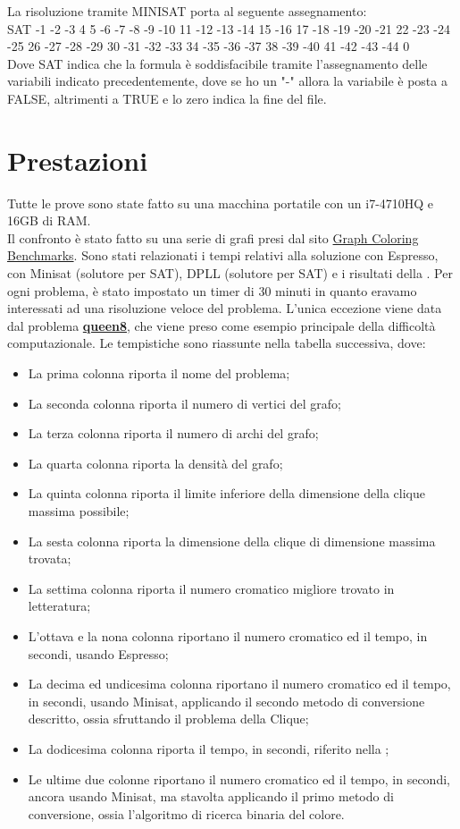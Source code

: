 \documentclass[a4paper,11pt]{article} %
\begin{document}
La risoluzione tramite MINISAT porta al seguente assegnamento:\\
SAT
-1 -2 -3 4 5 -6 -7 -8 -9 -10 11 -12 -13 -14 15 -16 17 -18 -19 -20 -21 22 -23 -24 -25 26 -27 -28 -29 30 -31 -32 -33 34 -35 -36 -37 38 -39 -40 41 -42 -43 -44 0\\
Dove SAT indica che la formula è soddisfacibile tramite l'assegnamento delle variabili indicato precedentemente, dove se ho un "-" allora la variabile è posta a FALSE, altrimenti a TRUE e lo zero indica la fine del file.

\pagebreak

\section{Prestazioni}
Tutte le prove sono state fatto su una macchina portatile con un i7-4710HQ e 16GB di RAM.\\
Il confronto è stato fatto su una serie di grafi presi dal sito \href{https://sites.google.com/site/graphcoloring/vertex-coloring}{Graph Coloring Benchmarks}\cite{site}. Sono stati relazionati i tempi relativi alla soluzione con Espresso, con Minisat \cite{minisat} (solutore per SAT), DPLL \cite{dpll}(solutore per SAT) e i risultati della \cite{tesi}.
Per ogni problema, è stato impostato un timer di 30 minuti in quanto eravamo interessati ad una risoluzione veloce del problema. L'unica eccezione viene data dal problema \href{https://it.wikipedia.org/wiki/Rompicapo_delle_otto_regine}{\textbf{queen8}}, che viene preso come esempio principale della difficoltà computazionale.
Le tempistiche sono riassunte nella tabella successiva, dove:
\begin{itemize}
	\item La prima colonna riporta il nome del problema;
	\item La seconda colonna riporta il numero di vertici del grafo;
	\item La terza colonna riporta il numero di archi del grafo;
	\item La quarta colonna riporta la densità del grafo;
	\item La quinta colonna riporta il limite inferiore della dimensione della clique massima possibile;
	\item La sesta colonna riporta la dimensione della clique di dimensione massima trovata;
	\item La settima colonna riporta il numero cromatico migliore trovato in letteratura;
	\item L'ottava e la nona colonna riportano il numero cromatico ed il tempo, in secondi, usando Espresso;
	\item La decima ed undicesima colonna riportano il numero cromatico ed il tempo, in secondi, usando Minisat, applicando il secondo metodo di conversione descritto, ossia sfruttando il problema della Clique;
	\item La dodicesima colonna riporta il tempo, in secondi, riferito nella \cite{tesi};
	\item Le ultime due colonne riportano il numero cromatico ed il tempo, in secondi, ancora usando Minisat, ma stavolta applicando il primo metodo di conversione, ossia l'algoritmo di ricerca binaria del colore.
\end{itemize}
\end{document}
